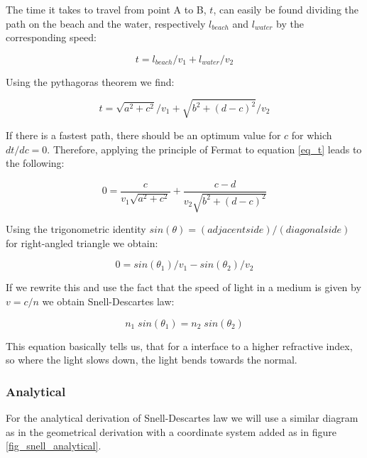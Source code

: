 \documentclass{article}
\begin{document}
The time it takes to travel from point A to B, $t$, can easily be found dividing the path on the beach and the water, respectively $l_{beach}$ and $l_{water}$ by the corresponding speed:

\begin{equation}
	t = l_{beach}/v_1 + l_{water}/v_2
\end{equation}

Using the pythagoras theorem we find:

\begin{equation}
	t = \sqrt{a^2 + c^2}/v_1 + \sqrt{b^2 + (d-c)^2}/v_2
	\label{eq_t}
\end{equation}

If there is a fastest path, there should be an optimum value for $c$ for which $dt/dc = 0$. Therefore, applying the principle of Fermat to equation \ref{eq_t} leads to the following:

\begin{equation}
	0 = \frac{c}{v_1 \sqrt{a^2 + c^2}} + \frac{c-d}{v_2 \sqrt{b^2 + (d-c)^2}}
\end{equation}

Using the trigonometric identity $sin(\theta) = (adjacent side)/(diagonal side)$ for right-angled triangle we obtain:

\begin{equation}
	0 =  sin(\theta _1)/v_1 - sin(\theta _2)/v_2
\end{equation}

If we rewrite this and use the fact that the speed of light in a medium is given by $v = c/n$ we obtain Snell-Descartes law:

\begin{equation}
	n_1 \; sin(\theta _1) = n_2 \; sin(\theta _2)
\end{equation}

This equation basically tells us, that for a interface to a higher refractive index, so where the light slows down, the light bends towards the normal.

\subsubsection{Analytical}

For the analytical derivation of Snell-Descartes law we will use a similar diagram as in the geometrical derivation with a coordinate system added as in figure \ref{fig_snell_analytical}.
\end{document}
